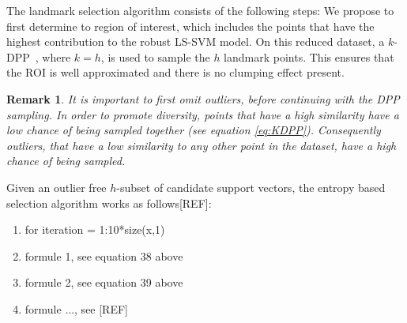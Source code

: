 \documentclass[preprint,12pt]{elsarticle}
\newtheorem*{remark}{Remark}
\begin{document}
	The landmark selection algorithm consists of the following steps:
	We propose to first determine to region of interest, which includes the points that have the highest contribution to the robust LS-SVM model. On this reduced dataset, a $k$-DPP~\cite{kulesza2011k}, where $k = h$, is used to sample the $h$ landmark points. This ensures that the ROI is well approximated and there is no clumping effect present. 
	
	\begin{remark}
		It is important to first omit outliers, before continuing with the DPP sampling. In order to promote diversity, points that have a high similarity have a low chance of being sampled together (see equation \eqref{eq:KDPP}). Consequently outliers, that have a low similarity to any other point in the dataset, have a high chance of being sampled.
	\end{remark}
	
	Given an outlier free $h$-subset of candidate support vectors, the entropy based selection algorithm works as follows[REF]:
	\begin{enumerate}
		\item for iteration = 1:10*size(x,1)
		\item formule 1, see equation 38 above
		\item formule 2, see equation 39 above
		\item formule ..., see [REF]
	\end{enumerate}
	
	\newpage
\end{document}
